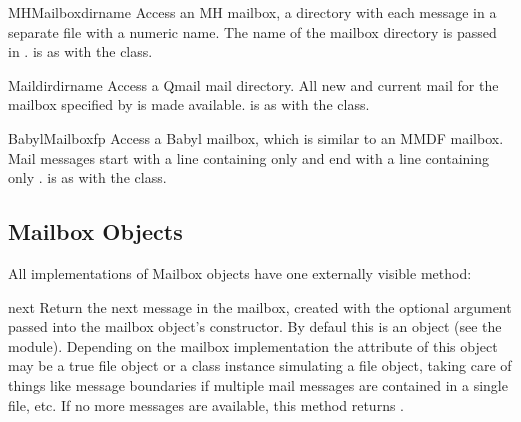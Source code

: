\begin{classdesc}{MHMailbox}{dirname}
Access an MH mailbox, a directory with each message in a separate
file with a numeric name.
The name of the mailbox directory is passed in .
 is as with the  class.
\end{classdesc}

\begin{classdesc}{Maildir}{dirname}
Access a Qmail mail directory.  All new and current mail for the
mailbox specified by  is made available.
 is as with the  class.
\end{classdesc}

\begin{classdesc}{BabylMailbox}{fp}
Access a Babyl mailbox, which is similar to an MMDF mailbox.  Mail
messages start with a line containing only  and
end with a line containing only .
 is as with the  class.
\end{classdesc}


\subsection{Mailbox Objects \label{mailbox-objects}}

All implementations of Mailbox objects have one externally visible
method:

\begin{methoddesc}[mailbox]{next}{}
Return the next message in the mailbox, created with the optional
 argument passed into the mailbox object's constructor.
By defaul this is an 
object (see the  module).  Depending on the mailbox
implementation the  attribute of this object may be a true
file object or a class instance simulating a file object, taking care
of things like message boundaries if multiple mail messages are
contained in a single file, etc.  If no more messages are available,
this method returns .
\end{methoddesc}
